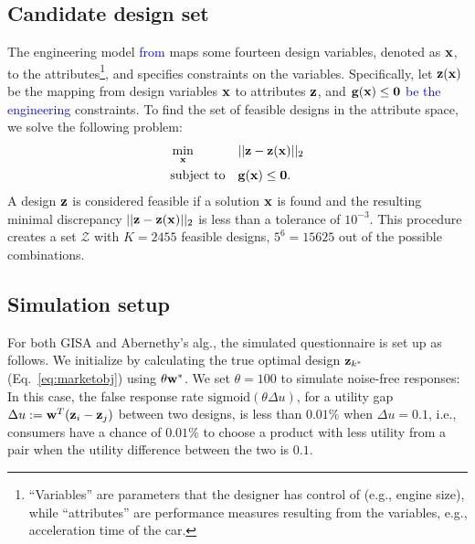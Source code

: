 \documentclass[onecolumn,11pt]{article}
\newcommand{\highlight}[1]{{\textcolor{blue}{{#1}}}}
\newcommand{\highlight}[1]{{{#1}}}
\newcommand{\cutsubsectionup}{\vspace*{-0.09in}}
\newcommand{\cutequationup}{\vspace*{-0.12in}}
\newcommand{\cutequationdown}{\vspace*{-0.12in}}
\newcommand{\cutsubsectionup}{}
\newcommand{\cutequationup}{}
\newcommand{\cutequationdown}{}
\begin{document}
\subsection{Candidate design set}
The engineering model \highlight{from \cite{michalek2005linking}} maps some fourteen design variables, denoted as ${\bf x}$, to the attributes\footnote{``Variables'' are parameters that the designer has control of (e.g., engine size), while ``attributes'' are performance measures resulting from the variables, e.g., acceleration time of the car.}, and specifies constraints on the variables. Specifically, let
${\bf z}({\bf x})$ be the mapping from design variables ${\bf x}$ to attributes
${\bf z}$, and ${\bf g}({\bf x}) \leq {\bf 0}$ \highlight{be the engineering} constraints. To find the set of feasible designs in the attribute space, we solve the following problem:
\cutequationup
\begin{equation}
\begin{aligned}
& \min_{\bf x} && ||{\bf z} - {\bf z}({\bf x})||_2 \\
& \text{subject to} && {\bf g}({\bf x}) \leq {\bf 0}. \\
\end{aligned}
\cutequationdown
\end{equation}
A design ${\bf z}$ is considered feasible if a solution ${\bf x}$ is found and the resulting minimal discrepancy $||{\bf z} - {\bf z}({\bf x})||_2$ is less than a tolerance of $10^{-3}$. This procedure creates a set $\mathcal{Z}$ with $K=2455$ feasible designs, $5^6 = 15625$ out of the possible combinations.

\cutsubsectionup
\subsection{Simulation setup}
\label{sec:setup}
For both GISA and Abernethy's alg., the simulated questionnaire is set up as follows. We initialize by calculating the true optimal design ${\bf z}_{k^*}$ (Eq.~\eqref{eq:marketobj}) using $\theta{\bf w}^*$. We set $\theta=100$ to simulate noise-free responses: In this case, the false response rate $\text{sigmoid}(\theta\Delta u)$, for a utility gap $\Delta u:={\bf w}^T({\bf z}_i-{\bf z}_j)$ between two designs, is less than $0.01\%$ when $\Delta u=0.1$, i.e., consumers have a chance of $0.01\%$ to choose a product with less utility from a pair when the utility difference between the two is $0.1$. 
\end{document}
